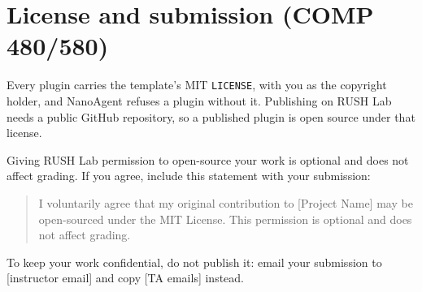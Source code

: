 \section{License and submission (COMP 480/580)}

Every plugin carries the template's MIT \texttt{LICENSE}, with you as the
copyright holder, and NanoAgent refuses a plugin without it. Publishing on
RUSH Lab needs a public GitHub repository, so a published plugin is open
source under that license.

Giving RUSH Lab permission to open-source your work is optional and does not
affect grading. If you agree, include this statement with your submission:

\begin{quote}
I voluntarily agree that my original contribution to [Project Name] may be
open-sourced under the MIT License. This permission is optional and does not
affect grading.
\end{quote}

To keep your work confidential, do not publish it: email your submission to
[instructor email] and copy [TA emails] instead.
